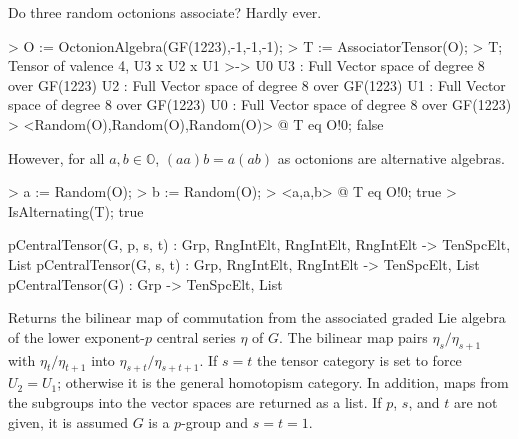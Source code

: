 \begin{example}[AssociatorFromAlgebra]

Do three random octonions associate? Hardly ever.

\begin{code}
> O := OctonionAlgebra(GF(1223),-1,-1,-1);
> T := AssociatorTensor(O);
> T;
Tensor of valence 4, U3 x U2 x U1 >-> U0
U3 : Full Vector space of degree 8 over GF(1223)
U2 : Full Vector space of degree 8 over GF(1223)
U1 : Full Vector space of degree 8 over GF(1223)
U0 : Full Vector space of degree 8 over GF(1223)
> <Random(O),Random(O),Random(O)> @ T eq O!0;
false
\end{code}

However, for all $a,b\in\mathbb{O}$, $(aa)b=a(ab)$ as octonions are alternative algebras.

\begin{code}
> a := Random(O); 
> b := Random(O); 
> <a,a,b> @ T eq O!0;
true
> IsAlternating(T);
true
\end{code}
\end{example}


\begin{intrinsics}
pCentralTensor(G, p, s, t) : Grp, RngIntElt, RngIntElt, RngIntElt -> TenSpcElt, List
pCentralTensor(G, s, t) : Grp, RngIntElt, RngIntElt -> TenSpcElt, List
pCentralTensor(G) : Grp -> TenSpcElt, List
\end{intrinsics}

Returns the bilinear map of commutation from the associated graded Lie algebra of the lower exponent-$p$ central
series $\eta$ of $G$.  The bilinear map pairs $\eta_s/\eta_{s+1}$ with $
\eta_{t}/\eta_{t+1}$ into $\eta_{s+t}/\eta_{s+t+1}$.  If $s=t$ the tensor 
category is set to force $U_2=U_1$; 
otherwise it is the general homotopism category.
In addition, maps from the subgroups into the vector spaces are returned as a list. 
If $p$, $s$, and $t$ are not given, it is assumed $G$ is a $p$-group and $s=t=1$.

